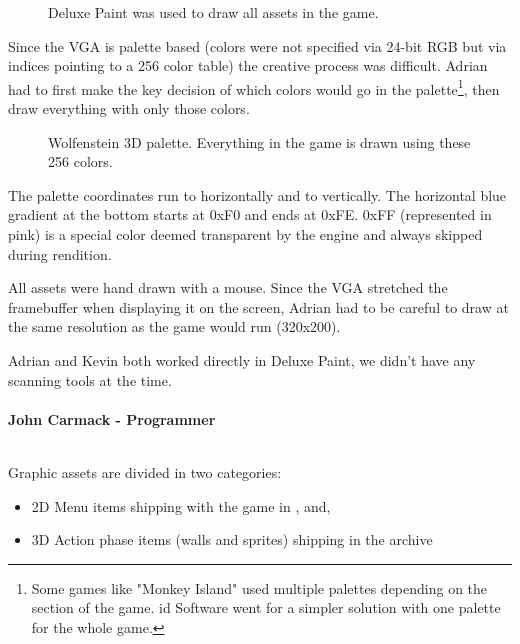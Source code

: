 \documentclass[book.tex]{subfiles}
\begin{document}
\begin{figure}[H]
  \centering
 \caption{Deluxe Paint was used to draw all assets in the game.}
\end{figure}


\par
Since the VGA is palette based (colors were not specified via 24-bit RGB but via indices pointing to a 256 color table) the creative process was difficult. Adrian had to first make the key decision of which colors would go in the palette\footnote{Some games like "Monkey Island" used multiple palettes depending on the section of the game. id Software went for a simpler solution with one palette for the whole game.}, then draw everything with only those colors.\\
\begin{figure}[H]
  \centering
{}
 \caption{Wolfenstein 3D palette. Everything in the game is drawn using these 256 colors.}
\end{figure}
The palette coordinates run  to  horizontally and  to  vertically. The horizontal blue gradient at the bottom starts at 0xF0 and ends at 0xFE. 0xFF (represented in pink) is a special color deemed transparent by the engine and always skipped during rendition.\\
\par

All assets were hand drawn with a mouse. Since the VGA stretched the framebuffer when displaying it on the screen, Adrian had to be careful to draw at the same resolution as the game would run (320x200).\\
\par
\begin{fancyquotes}
Adrian and Kevin both worked directly in Deluxe Paint, we didn't have any scanning tools at the time.\\
\\
\textbf{John Carmack - Programmer}
\end{fancyquotes}
\\
Graphic assets are divided in two categories:
\begin{itemize}
\item 2D Menu items shipping with the game in ,  and, 
\item 3D Action phase items (walls and sprites) shipping in the  archive
\end{itemize}
\end{document}
